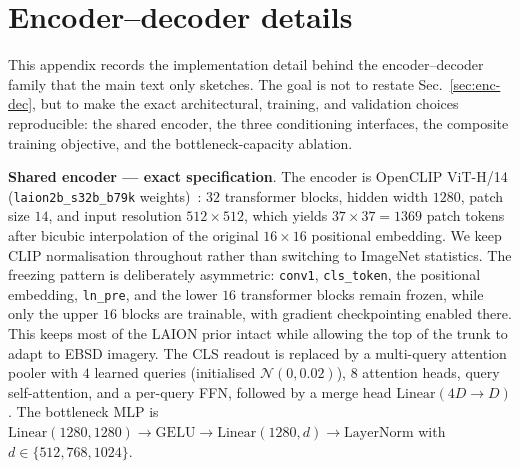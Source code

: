 \documentclass{article}
\begin{document}
\section{Encoder--decoder details}
\label{app:enc-dec}

This appendix records the implementation detail behind the encoder--decoder family that the main text only sketches. The goal is not to restate Sec.~\ref{sec:enc-dec}, but to make the exact architectural, training, and validation choices reproducible: the shared encoder, the three conditioning interfaces, the composite training objective, and the bottleneck-capacity ablation.

\textbf{Shared encoder --- exact specification}. The encoder is OpenCLIP ViT-H/14 (\texttt{laion2b\_s32b\_b79k} weights)~\citep{radford2021clip,schuhmann2022laion5b}: $32$ transformer blocks, hidden width $1280$, patch size $14$, and input resolution $512{\times}512$, which yields $37{\times}37{=}1369$ patch tokens after bicubic interpolation of the original $16{\times}16$ positional embedding. We keep CLIP normalisation throughout rather than switching to ImageNet statistics. The freezing pattern is deliberately asymmetric: \texttt{conv1}, \texttt{cls\_token}, the positional embedding, \texttt{ln\_pre}, and the lower $16$ transformer blocks remain frozen, while only the upper $16$ blocks are trainable, with gradient checkpointing enabled there. This keeps most of the LAION prior intact while allowing the top of the trunk to adapt to EBSD imagery. The CLS readout is replaced by a multi-query attention pooler with $4$ learned queries (initialised $\mathcal{N}(0,0.02)$), $8$ attention heads, query self-attention, and a per-query FFN, followed by a merge head $\mathrm{Linear}(4D \to D)$. The bottleneck MLP is $\mathrm{Linear}(1280,1280)\to\mathrm{GELU}\to\mathrm{Linear}(1280,d)\to\mathrm{LayerNorm}$ with $d \in \{512,768,1024\}$.
\end{document}
